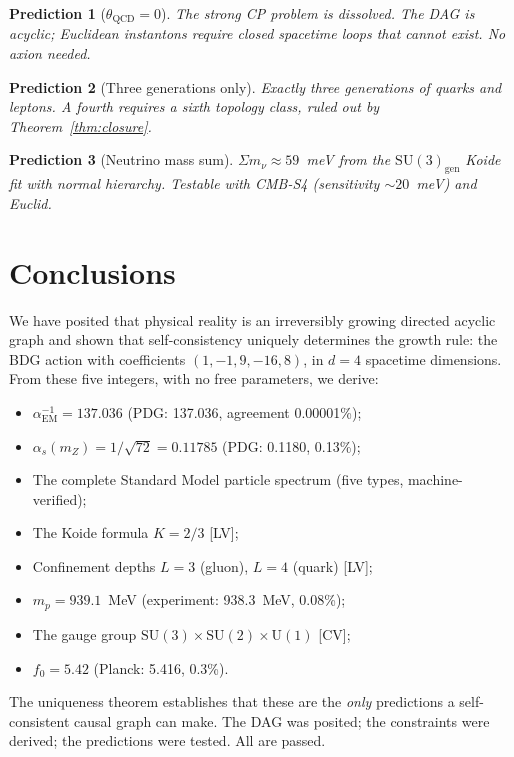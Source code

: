 \documentclass[12pt,a4paper]{article}
\newtheorem{prediction}{Prediction}
\begin{document}
\begin{prediction}[$\theta_{\mathrm{QCD}} = 0$]\label{pred:theta}
The strong CP problem is dissolved. The DAG is acyclic; Euclidean instantons require closed spacetime loops that cannot exist. No axion needed.
\end{prediction}

\begin{prediction}[Three generations only]\label{pred:generations}
Exactly three generations of quarks and leptons. A fourth requires a sixth topology class, ruled out by Theorem~\ref{thm:closure}.
\end{prediction}

\begin{prediction}[Neutrino mass sum]\label{pred:neutrino}
$\Sigma m_\nu \approx 59$~meV from the $\mathrm{SU}(3)_{\mathrm{gen}}$ Koide fit with normal hierarchy. Testable with CMB-S4 (sensitivity $\sim 20$~meV) and Euclid.
\end{prediction}

\section{Conclusions}\label{sec:conclusions}

We have posited that physical reality is an irreversibly growing directed acyclic graph and shown that self-consistency uniquely determines the growth rule: the BDG action with coefficients $(1,-1,9,-16,8)$, in $d=4$ spacetime dimensions. From these five integers, with no free parameters, we derive:
\begin{itemize}[nosep]
\item $\alpha_{\mathrm{EM}}^{-1} = 137.036$ (PDG: 137.036, agreement 0.00001\%);
\item $\alpha_s(m_Z) = 1/\sqrt{72} = 0.11785$ (PDG: 0.1180, 0.13\%);
\item The complete Standard Model particle spectrum (five types, machine-verified);
\item The Koide formula $K = 2/3$ [LV];
\item Confinement depths $L=3$ (gluon), $L=4$ (quark) [LV];
\item $m_p = 939.1$~MeV (experiment: 938.3~MeV, 0.08\%);
\item The gauge group $\mathrm{SU}(3)\times\mathrm{SU}(2)\times\mathrm{U}(1)$ [CV];
\item $f_0 = 5.42$ (Planck: 5.416, 0.3\%).
\end{itemize}
The uniqueness theorem establishes that these are the \emph{only} predictions a self-consistent causal graph can make. The DAG was posited; the constraints were derived; the predictions were tested. All are passed.
\end{document}
